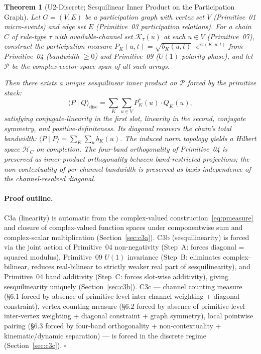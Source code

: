 \documentclass[11pt,a4paper]{article}
\newtheorem{theorem}{Theorem}[section]
\begin{document}
\begin{theorem}[U2-Discrete; Sesquilinear Inner Product on the Participation Graph]
Let $G = (V, E)$ be a participation graph with vertex set $V$ (Primitive~01 micro-events) and edge set $E$ (Primitive~03 participation relations). For a chain $C$ of rule-type $\tau$ with available-channel set $\mathcal{K}_\tau(u)$ at each $u \in V$ (Primitive~07), construct the participation measure $P_K(u, t) = \sqrt{b_K(u, t)} \cdot e^{i \pi(K, u, t)}$ from Primitive~04 (bandwidth $\geq 0$) and Primitive~09 ($U(1)$ polarity phase), and let $\mathcal{P}$ be the complex-vector-space span of all such arrays.

Then there exists a unique sesquilinear inner product on $\mathcal{P}$ forced by the primitive stack:
\begin{equation}
\langle P \mid Q \rangle_\mathrm{disc} = \sum_K \sum_{u \in V} P_K^*(u) \cdot Q_K(u),
\label{eq:thmdiscrete}
\end{equation}
satisfying conjugate-linearity in the first slot, linearity in the second, conjugate symmetry, and positive-definiteness. Its diagonal recovers the chain's total bandwidth: $\langle P \mid P \rangle = \sum_K \sum_u b_K(u)$. The induced norm topology yields a Hilbert space $\mathcal{H}_C$ on completion. The four-band orthogonality of Primitive~04 is preserved as inner-product orthogonality between band-restricted projections; the non-contextuality of per-channel bandwidth is preserved as basis-independence of the channel-resolved diagonal.
\end{theorem}

\paragraph{Proof outline.} C3a (linearity) is automatic from the complex-valued construction~\eqref{eq:pmeasure} and closure of complex-valued function spaces under componentwise sum and complex-scalar multiplication (Section~\ref{sec:c3a}). C3b (sesquilinearity) is forced via the joint action of Primitive~04 non-negativity (Step~A: forces diagonal = squared modulus), Primitive~09 $U(1)$ invariance (Step~B: eliminates complex-bilinear, reduces real-bilinear to strictly weaker real part of sesquilinearity), and Primitive~04 band additivity (Step~C: forces slot-wise additivity), giving sesquilinearity uniquely (Section~\ref{sec:c3b}). C3c --- channel counting measure (\S 6.1 forced by absence of primitive-level inter-channel weighting + diagonal constraint), vertex counting measure (\S 6.2 forced by absence of primitive-level inter-vertex weighting + diagonal constraint + graph symmetry), local pointwise pairing (\S 6.3 forced by four-band orthogonality + non-contextuality + kinematic/dynamic separation) --- is forced in the discrete regime (Section~\ref{sec:c3c}). \hfill$\square$
\end{document}
